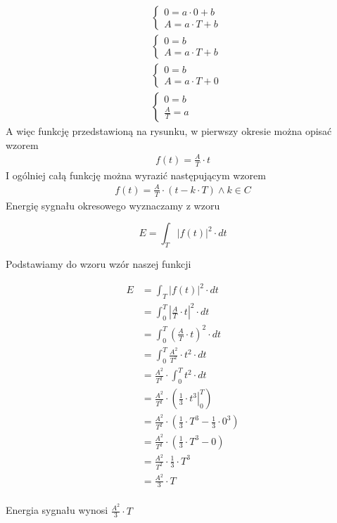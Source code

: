 \begin{align*}
&\left\{\begin{matrix}
0 = a\cdot 0 +b\\ 
A = a\cdot T +b
\end{matrix}\right. \\
&\left\{\begin{matrix}
0 = b\\ 
A = a\cdot T +b
\end{matrix}\right. \\
&\left\{\begin{matrix}
0 = b\\ 
A = a\cdot T +0
\end{matrix}\right. \\
&\left\{\begin{matrix}
0 = b\\ 
\frac{A}{T} = a
\end{matrix}\right.
\end{align*}
A więc funkcję przedstawioną na rysunku, w pierwszy okresie można opisać wzorem
\begin{align*}
f(t) = \frac{A}{T}\cdot t
\end{align*}
I ogólniej całą funkcję można wyrazić następującym wzorem
\begin{align*}
f(t) = \frac{A}{T}\cdot \left(t-k\cdot T\right) \wedge k \in C
\end{align*}
Energię sygnału okresowego wyznaczamy z wzoru


\begin{equation}
E=\int_{T}^{}\left|f(t)\right|^2 \cdot dt
\end{equation}

Podstawiamy do wzoru wzór naszej funkcji

\begin{align*}
E&=\int_{T}^{}\left|f(t)\right|^2 \cdot dt\\
 &=\int_{0}^{T}\left|\frac{A}{T}\cdot t \right|^2 \cdot dt\\ 
 &=\int_{0}^{T}\left(\frac{A}{T}\cdot t \right)^2 \cdot dt\\ 
 &=\int_{0}^{T}\frac{A^2}{T^2}\cdot t^2 \cdot dt\\ 
 &=\frac{A^2}{T^2}\cdot \int_{0}^{T} t^2 \cdot dt\\ 
 &=\frac{A^2}{T^2}\cdot \left(\left. \frac{1}{3}\cdot t^3 \right|_{0}^{T}\right)\\ 
 &=\frac{A^2}{T^2}\cdot \left(\frac{1}{3}\cdot T^3  - \frac{1}{3}\cdot 0^3 \right)\\
 &=\frac{A^2}{T^2}\cdot \left(\frac{1}{3}\cdot T^3  - 0 \right)\\
 &=\frac{A^2}{T^2}\cdot \frac{1}{3}\cdot T^3\\
 &=\frac{A^2}{3}\cdot T\\
\end{align*}

Energia sygnału wynosi $\frac{A^2}{3}\cdot T$
\newpage
